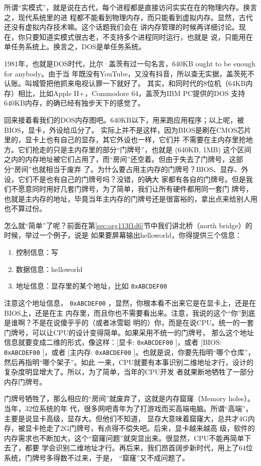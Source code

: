 \documentclass{wx672ctexart}
\begin{document}
所谓“实模式”，就是说在古代，每个进程都是直接访问实实在在的物理内存。换言之，现代系统里的进
程都不能看到物理内存，而只能看到虚拟内存。显然，古代还没有虚拟内存技术嘛。这个话题我们会在
讲内存管理的时候再详细讨论。现在，你只要知道实模式很古老，不支持多个进程同时运行，也就是
说，只能用在单任务系统上。换言之，DOS是单任务系统。

1981年，也就是DOS时代，比尔·盖茨有过一句名言，640KB ought to be enough for anybody。由于当
年既没有YouTube，又没有抖音，所以查无实据，盖茨死不认账。叫城管把他抓来电视认罪一下就好了。
其实，和同时代的8位机（64KB内存）相比，比如Apple II+，Commodore 64，盖茨为IBM PC提供的DOS
支持640KB内存，的确已经有独步天下的感觉了。

回来接着看我们的DOS内存图吧。640KB以下，用来跑应用程序；以上呢，被BIOS，显卡，外设给瓜分了。
实际上并不是这样，因为BIOS是刷在CMOS芯片里的，显卡上也有自己的显存，其它外设也一样，它们并
不需要在主内存里抢地方。它们抢走的只是主内存里的部分“门牌号”，也就是 (640KB, 1MB) 这个区间
之内的内存地址被它们占用了，而“房间”还空着。但由于失去了门牌号，这部分“房间”也就相当于废弃
了。为什么要占用主内存的门牌号？BIOS、显存、外设，它们不是也有自己的门牌号吗？没错，的确大
家都有各自的门牌号。但是我们不愿意同时用好几套门牌号，为了简单，我们让所有硬件都用同一套门
牌号，也就是主内存的地址，毕竟当年主内存的门牌号还是很富裕的，拿出点来给别人用也不算过份。

怎么就“简单”了呢？前面在第\ref{sec:org113f1d6}节中我们讲北桥（north bridge）的时候，举过一个例子，说是
如果要屏幕输出helloworld，你得提供三个信息：
\begin{enumerate}
\item 控制信息：写
\item 数据信息：helloworld
\item 地址信息：显存里的某个地址，比如 \texttt{0xABCDEF00}
\end{enumerate}

注意这个地址信息， \texttt{0xABCDEF00} ，显然，你根本看不出来它是在显卡上，还是在BIOS上，还是在主
内存里，而且你也不需要看出来。注意，我说的这个“你”到底是谁啊？不是在说傻乎乎的（或者冰雪聪
明的）你，而是在说CPU。统一的一套门牌号，可以让CPU的设计变得简单。如果采用不统一的门牌号，
那么这个地址信息就要变成二维的形式，像这样：[显卡: \texttt{0xABCDEF00} ]，或者 [BIOS: \texttt{0xABCDEF00}
]，或者 [主内存: \texttt{0xABCDEF00} ]。也就是说，你要先指明“哪个仓库”，然后再指明“哪个架子”。如此
一来，CPU就要有本事识别二维地址才行，设计的复杂度明显增大了。所以，为了简单，当年的CPU开发
者就果断地牺牲了一部分内存门牌号。

门牌号牺牲了，那么相应的“房间”就废弃了，这就是内存窟窿（Memory holes）。当年，32位系统的年
代，很多网吧青年为了打游戏而买高端电脑。所谓“高端”，主要是说显卡高级，显存大。但他们不知道，
显存大意味着窟窿大，总共才4G内存，被显卡抢走了2G门牌号，有点得不偿失吧。后来，显卡越来越高
级，软件的内存需求也不断加大，这个“窟窿问题”就突显出来。很显然，CPU不能再简单下去了，都要
学会识别二维地址才行。再后来，我们昂首阔步新时代，用上了64位系统，门牌号多得数不过来，于是，
“窟窿”又不成问题了。
\end{document}
